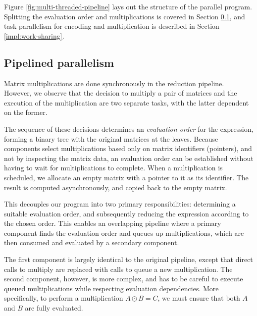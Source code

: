 Figure \ref{fig:multi-threaded-pipeline} lays out the structure of the parallel 
program. Splitting the evaluation order and multiplications is covered in Section \ref{impl:split-compute},
and task-parallelism for encoding and multiplication is described in Section \ref{impl:work-sharing}.

\subsection{Pipelined parallelism} \label{impl:split-compute}


Matrix multiplications are done synchronously in the reduction pipeline. However, we observe that the decision to
multiply a pair of matrices and the execution of the multiplication are two separate tasks, with the latter dependent
on the former.

The sequence of these decisions determines an \textit{evaluation order} for the expression, forming a binary tree with
the original matrices at the leaves.
Because components select multiplications based only on matrix identifiers (pointers), and not by inspecting the matrix
data, an evaluation order can be established without having to wait for multiplications to complete.
When a multiplication is scheduled, we allocate an empty matrix with a pointer to it as its identifier.
The result is computed asynchronously, and copied back to the empty matrix.

This decouples our program into two primary responsibilities: determining a suitable evaluation order, 
and subsequently reducing the expression according to the chosen order. This enables an overlapping pipeline
where a primary component finds the evaluation order and queues up multiplications, which are then consumed and
evaluated by a secondary component.

The first component is largely identical to the original pipeline, except that direct calls to multiply are replaced
with calls to queue a new multiplication. The second component, however, is more complex, and has to be careful to
execute queued multiplications while respecting evaluation dependencies.
More specifically, to perform a multiplication $A\odot B=C$, we must ensure that both $A$ and $B$ are fully evaluated.

